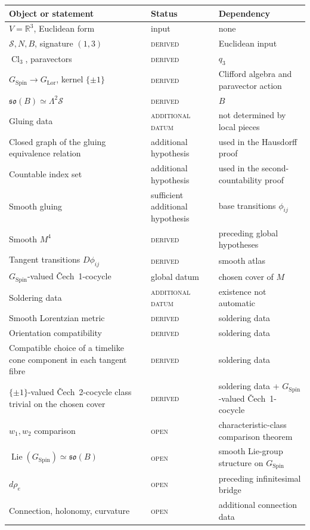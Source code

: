 \documentclass[11pt,a4paper]{article}
\theoremstyle{definition}
\theoremstyle{remark}
\newcommand{\R}{\mathbb{R}}
\newcommand{\Smodel}{\mathcal{S}}
\newcommand{\Cl}{\operatorname{Cl}}
\newcommand{\SpinG}{G_{\mathrm{Spin}}}
\newcommand{\LorG}{G_{\mathrm{Lor}}}
\newcommand{\Cech}{\ifmmode\text{\v{C}ech}\else\v{C}ech\fi}
\newcommand{\soB}{\mathfrak{so}(B)}
\newcommand{\statusderived}{\textsc{derived}}
\newcommand{\statusdatum}{\textsc{additional datum}}
\newcommand{\statusopen}{\textsc{open}}
\begin{document}
\begin{center}
\small
\begin{tabular}{>{\raggedright\arraybackslash}p{}
                >{\raggedright\arraybackslash}p{}
                >{\raggedright\arraybackslash}p{}}
\toprule
Object or statement & Status & Dependency \\
\midrule
\(V=\R^{3}\), Euclidean form & input & none \\
\(\Smodel,N,B\), signature \((1,3)\) & \statusderived & Euclidean input \\
\(\Cl_{3}\), paravectors & \statusderived & \(q_{3}\) \\
\(\SpinG\to\LorG\), kernel \(\{\pm1\}\) & \statusderived & Clifford algebra and paravector action \\
\(\soB\simeq\Lambda^{2}\Smodel\) & \statusderived & \(B\) \\
Gluing data & \statusdatum & not determined by local pieces \\
Closed graph of the gluing equivalence relation & additional hypothesis & used in the Hausdorff proof \\
Countable index set & additional hypothesis & used in the second-countability proof \\
Smooth gluing & sufficient additional hypothesis & base transitions \(\phi_{ij}\) \\
Smooth \(M^{4}\) & \statusderived & preceding global hypotheses \\
Tangent transitions \(D\phi_{ij}\) & \statusderived & smooth atlas \\
\(\SpinG\)-valued \Cech\ 1-cocycle & global datum & chosen cover of \(M\) \\
Soldering data & \statusdatum & existence not automatic \\
Smooth Lorentzian metric & \statusderived & soldering data \\
Orientation compatibility & \statusderived & soldering data \\
Compatible choice of a timelike cone component in each tangent fibre & \statusderived & soldering data \\
\(\{\pm1\}\)-valued \Cech\ 2-cocycle class trivial on the chosen cover & \statusderived & soldering data + \(\SpinG\)-valued \Cech\ 1-cocycle \\
\(w_1,w_2\) comparison & \statusopen & characteristic-class comparison theorem \\
\(\operatorname{Lie}(\SpinG)\simeq\soB\) & \statusopen & smooth Lie-group structure on \(\SpinG\) \\
\(d\rho_e\) & \statusopen & preceding infinitesimal bridge \\
Connection, holonomy, curvature & \statusopen & additional connection data \\
\bottomrule
\end{tabular}
\end{center}
\end{document}
